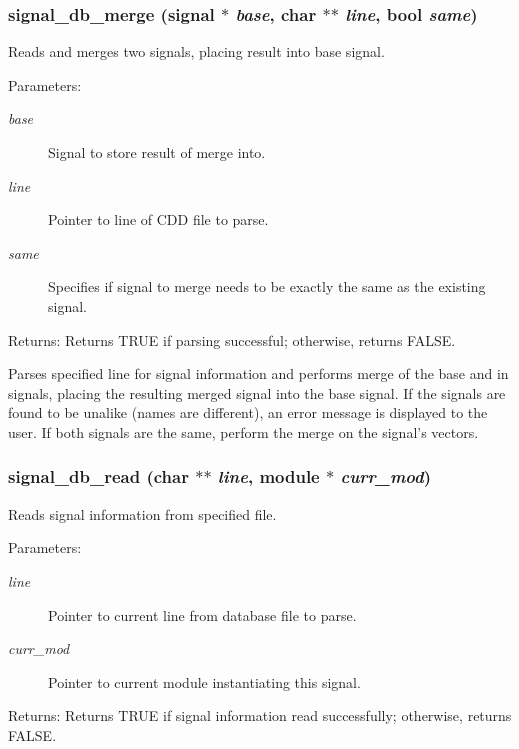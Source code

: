 \subsubsection{ signal\_\-db\_\-merge ({\bf signal} $\ast$ {\em base}, char $\ast$$\ast$ {\em line}, {\bf bool} {\em same})}\label{signal_8c_a6}


Reads and merges two signals, placing result into base signal.

\begin{Desc}
\item[Parameters:]
\begin{description}
\item[{\em base}]Signal to store result of merge into. \item[{\em line}]Pointer to line of CDD file to parse. \item[{\em same}]Specifies if signal to merge needs to be exactly the same as the existing signal.\end{description}
\end{Desc}
\begin{Desc}
\item[Returns:]Returns TRUE if parsing successful; otherwise, returns FALSE.\end{Desc}
Parses specified line for signal information and performs merge of the base and in signals, placing the resulting merged signal into the base signal. If the signals are found to be unalike (names are different), an error message is displayed to the user. If both signals are the same, perform the merge on the signal's vectors. 
\subsubsection{ signal\_\-db\_\-read (char $\ast$$\ast$ {\em line}, {\bf module} $\ast$ {\em curr\_\-mod})}\label{signal_8c_a5}


Reads signal information from specified file.

\begin{Desc}
\item[Parameters:]
\begin{description}
\item[{\em line}]Pointer to current line from database file to parse. \item[{\em curr\_\-mod}]Pointer to current module instantiating this signal.\end{description}
\end{Desc}
\begin{Desc}
\item[Returns:]Returns TRUE if signal information read successfully; otherwise, returns FALSE.\end{Desc}


